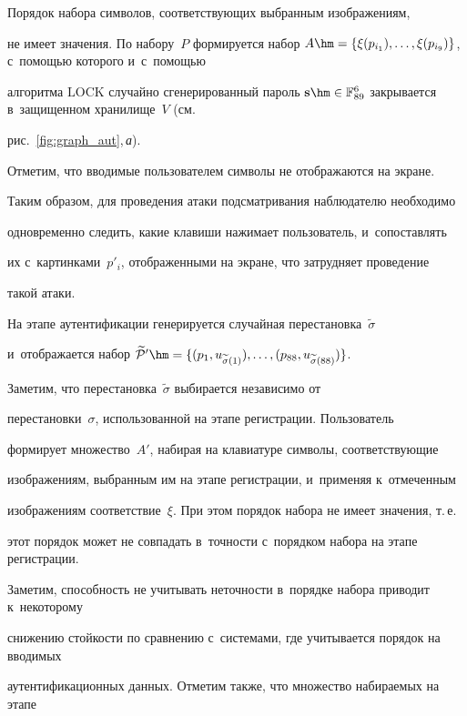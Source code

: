 Порядок набора символов, соответствующих выбранным изображениям, 


не имеет значения. По набору~$P$ формируется набор $A\hm=


\{\xi(p_{i_1}),\ldots,\xi(p_{i_9})\}$, с~помощью которого и~с~помощью 


алгоритма $\mathrm{LOCK}$ случайно сгенерированный пароль $\mathbf{s}\hm\in 


\mathbb{F}^{6}_{89}$ закрывается в~защищенном хранилище~$V$ (см.\ 


рис.~\ref{fig:graph_aut},\,\textit{а}). 


Отметим, что вводимые пользователем символы не отображаются на экране. 


Таким образом, для проведения атаки подсматривания наблюдателю необходимо 


одновременно следить, какие клавиши нажимает пользователь, и~сопоставлять 


их с~картинками~$p'_i$, отображенными на экране, что затрудняет проведение 


такой атаки.





На этапе аутентификации генерируется случайная перестановка~$\widetilde{\sigma}$ 


и~отображается набор $\widetilde{\mathcal{P}}'\hm=


\{(p_1,u_{\widetilde{\sigma}(1)}),\ldots,(p_{88},u_{\widetilde{\sigma}(88)})\}$. 


Заметим, что перестановка~$\widetilde{\sigma}$ выбирается независимо от 


перестановки~${\sigma}$, использованной на этапе регистрации. Пользователь 


формирует множество~$A'$, набирая на клавиатуре символы, соответствующие 


изображениям, выбранным им на этапе регистрации, и~применяя к~отмеченным 


изображениям соответствие~$\xi$. При этом порядок набора не имеет значения, т.\,е.\


 этот порядок может  не совпадать в~точ\-ности с~порядком набора на этапе регистрации. 


 Заметим, способность не учитывать неточности в~порядке набора приводит к~некоторому 


 снижению стойкости по сравнению с~системами, где учитывается порядок на вводимых 


 аутентификационных данных. Отметим также, что множество набираемых на этапе 


